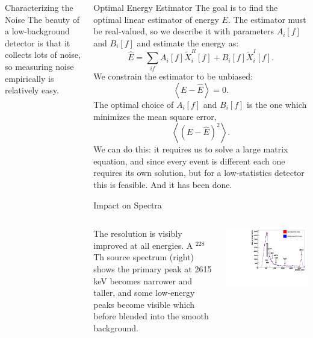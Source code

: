 \documentclass[final]{beamer} %
\begin{document}
\begin{frame}{}
\begin{columns}[t]
\begin{column}{.3\linewidth}
\begin{block}{\large Characterizing the Noise}
The beauty of a low-background detector is that it collects lots of noise, so measuring noise empirically is relatively easy.
    \end{block}

  \end{column}


  \begin{column}{.3\linewidth}

    \begin{block}{Optimal Energy Estimator}
      The goal is to find the optimal linear estimator of energy $E$.  The estimator must be real-valued, so we describe it with parameters $A_i[f]$ and $B_i[f]$ and estimate the energy as:
\[\widehat{E} = \sum_{if} A_i[f]\widetilde{X}^R_i[f] + B_i[f]\widetilde{X}^I_i[f].\]
We constrain the estimator to be unbiased:
\[\left<E-\widehat{E}\right> = 0.\]
The optimal choice of $A_i[f]$ and $B_i[f]$ is the one which minimizes the mean square error,
\[\left<\left(E-\widehat{E}\right)^2\right>.\]
We can do this: it requires us to solve a large matrix equation, and since every event is different each one requires its own solution, but for a low-statistics detector this is feasible.  And it has been done.
    \end{block}

    \begin{block}{Impact on Spectra}
      \begin{columns}
        \begin{column}{0.37\textwidth}
          The resolution is visibly improved at all energies.  A $^{228}$Th source spectrum (right) shows the primary peak at 2615 keV becomes narrower and taller, and some low-energy peaks become visible which before blended into the smooth background.
        \end{column}
        \begin{column}{0.63\textwidth}
          \includegraphics[keepaspectratio=true,width=\textwidth]{ThSourceSpectrumComparison.pdf}
        \end{column}
      \end{columns}


\end{block}
\end{column}
\end{columns}
\end{frame}
\end{document}
